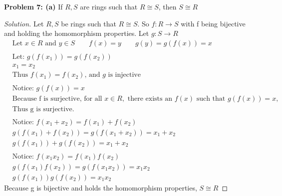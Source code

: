 \documentclass[12pt]{article}
\begin{document}
\newpage
\noindent \textbf{Problem 7: (a)} If $R,S$ are rings such that $R \cong S$, then $S \cong R$
	\begin{proof}[Solution]
		Let $R,S$ be rings such that $R \cong S$.  So $f: R \rightarrow S$ with f being bijective and holding the homomorphism properties. Let $g:S \rightarrow R$
		\begin{align*}
			&\text{Let $x \in R$ and $y \in S$} \qquad f(x) = y \qquad g(y) = g(f(x)) = x \\ \\
			&\text{Let: } g(f(x_1)) = g(f(x_2)) \\
			&x_1 = x_2 \\
			&\text{Thus $f(x_1) = f(x_2)$, and $g$ is injective} \\\\
			&\text{Notice: } g(f(x)) = x \\
			&\text{Because f is surjective, for all } x \in R, \text{ there exists an } f(x) \text{ such that $g(f(x)) = x$,} \\
			&\text{Thus g is surjective.} \\ \\
			&\text{Notice: } f(x_1 + x_2) = f(x_1) + f(x_2)\\
			&g(f(x_1) + f(x_2)) = g(f(x_1 + x_2)) = x_1 + x_2 \\
			&g(f(x_1)) + g(f(x_2)) = x_1 + x_2 \\ \\
			&\text{Notice: } f(x_1x_2) = f(x_1)f(x_2) \\
			&g(f(x_1)f(x_2)) = g(f(x_1x_2)) = x_1x_2 \\
			&g(f(x_1))g(f(x_2)) = x_1x_2			
		\end{align*}
		Because g is bijective and holds the homomorphism properties, $S \cong R$ 
	\end{proof}
\end{document}
